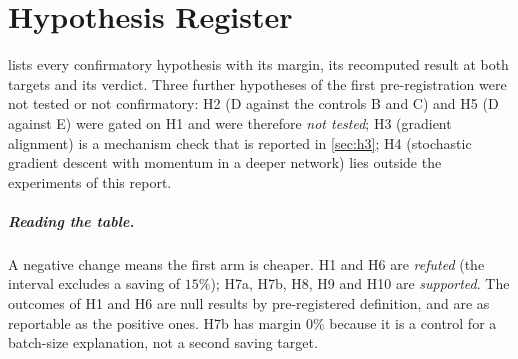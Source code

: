 \chapter{Hypothesis Register}\label{app:hypotheses}
 lists every confirmatory hypothesis with its margin, its recomputed result at both targets and its verdict. Three further hypotheses of the first pre-registration were not tested or not confirmatory: H2 (D against the controls B and C) and H5 (D against E) were gated on H1 and were therefore \emph{not tested}; H3 (gradient alignment) is a mechanism check that is reported in \cref{sec:h3}; H4 (stochastic gradient descent with momentum in a deeper network) lies outside the experiments of this report.

\begin{table}[h]
\centering\small
\caption{Confirmatory hypotheses. Intervals: $97.5\%$ for H1, H6, H7a, H7b and $98.3\%$ for H8--H10, paired bootstrap. A verdict needs both targets to agree (\cref{sec:stats}). The ``margin'' is the saving that must be exceeded for \emph{supported}.}
\label{tab:hyp}
\end{table}

\paragraph{Reading the table.} A negative change means the first arm is cheaper. H1 and H6 are \emph{refuted} (the interval excludes a saving of $15\%$); H7a, H7b, H8, H9 and H10 are \emph{supported}. The outcomes of H1 and H6 are null results by pre-registered definition, and are as reportable as the positive ones. H7b has margin $0\%$ because it is a control for a batch-size explanation, not a second saving target.
